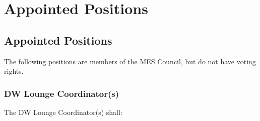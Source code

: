 


% 

\hypertarget{appointed-positions}{%
 \section{Appointed Positions}
 \label{appointed-positions}}

\hypertarget{appointed-positions1}{%
 \subsection{Appointed Positions}
 \label{appointed-positions1}}

The following positions are members of the MES Council, but do not have
voting rights.

\hypertarget{dw-lounge-coordinators}{%
 \subsubsection{DW Lounge Coordinator(s)}
 \label{dw-lounge-coordinators}}

The DW Lounge Coordinator(s) shall:

